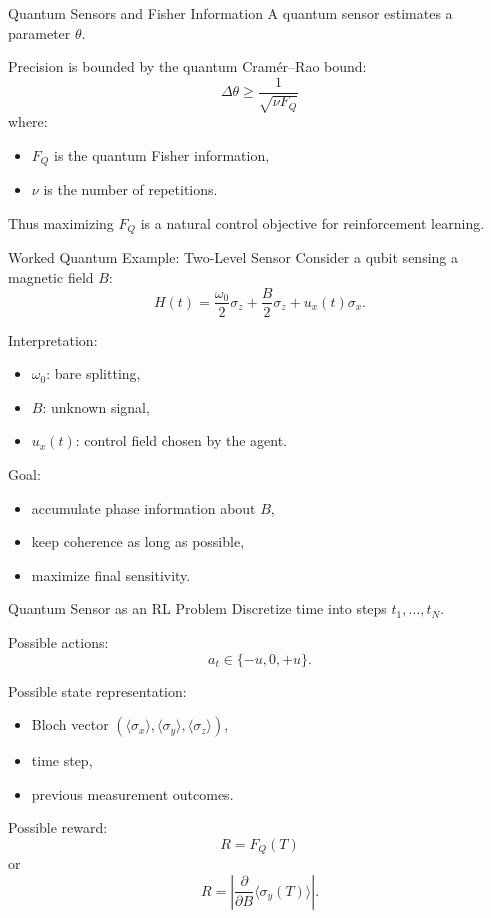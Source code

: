 \documentclass{beamer}
\begin{document}
\begin{frame}{Quantum Sensors and Fisher Information}
  A quantum sensor estimates a parameter $\theta$.

  Precision is bounded by the quantum Cram\'er--Rao bound:
  \[
  \Delta \theta \ge \frac{1}{\sqrt{\nu F_Q}}
  \]
  where:
  \begin{itemize}
  \item $F_Q$ is the quantum Fisher information,
  \item $\nu$ is the number of repetitions.
  \end{itemize}

  Thus maximizing $F_Q$ is a natural control objective for reinforcement learning.
\end{frame}

\begin{frame}{Worked Quantum Example: Two-Level Sensor}
  Consider a qubit sensing a magnetic field $B$:
  \[
  H(t)=\frac{\omega_0}{2}\sigma_z + \frac{B}{2}\sigma_z + u_x(t)\sigma_x.
  \]

  Interpretation:
  \begin{itemize}
  \item $\omega_0$: bare splitting,
  \item $B$: unknown signal,
  \item $u_x(t)$: control field chosen by the agent.
  \end{itemize}

  Goal:
  \begin{itemize}
  \item accumulate phase information about $B$,
  \item keep coherence as long as possible,
  \item maximize final sensitivity.
  \end{itemize}
\end{frame}

\begin{frame}{Quantum Sensor as an RL Problem}
  Discretize time into steps $t_1,\dots,t_N$.

  Possible actions:
  \[
  a_t \in \{-u,0,+u\}.
  \]

  Possible state representation:
  \begin{itemize}
  \item Bloch vector $(\langle \sigma_x\rangle,\langle \sigma_y\rangle,\langle \sigma_z\rangle)$,
  \item time step,
  \item previous measurement outcomes.
  \end{itemize}

  Possible reward:
  \[
  R = F_Q(T)
  \]
  or
  \[
  R=\left|\frac{\partial}{\partial B}\langle \sigma_y(T)\rangle\right|.
  \]
\end{frame}
\end{document}
